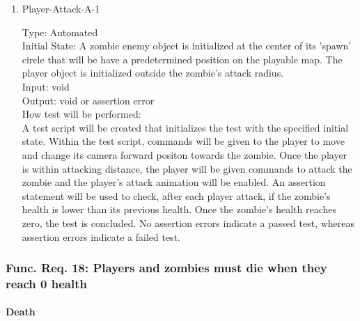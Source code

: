 \documentclass[12pt, titlepage]{article}
\begin{document}
\begin{enumerate}

\item{Player-Attack-A-1\\}

Type: Automated \\
					
Initial State: A zombie enemy object is initialized at the center of its 'spawn' circle that will be have a predetermined position on the playable map. The player object is initialized outside the zombie's attack radius.\\
					
Input: void \\
					
Output: void or assertion error \\
					
How test will be performed:\\  A test script will be created that initializes the test with the specified initial state. Within the test script, commands will be given to the player to move and change its camera forward positon towards the zombie. Once the player is within attacking distance, the player will be given commands to attack the zombie and the player's attack animation will be enabled. An assertion statement will be used to check, after each player attack, if the zombie's health is lower than its previous health. Once the zombie's health reaches zero, the test is concluded. No assertion errors indicate a passed test, whereas assertion errors indicate a failed test.\\

\end{enumerate}

\subsubsection{Func. Req. 18: Players and zombies must die when they reach 0 health}

\paragraph{Death}
\end{document}
